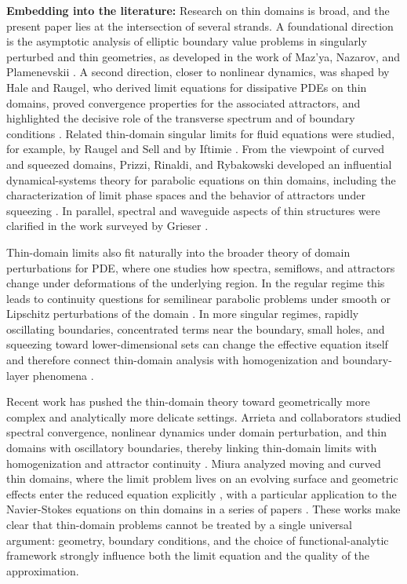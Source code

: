 \documentclass[11pt]{article}
\theoremstyle{definition}
\theoremstyle{remark}
\numberwithin{equation}{section}
\begin{document}
\textbf{Embedding into the literature:} Research on thin domains is broad, and the present paper lies at the intersection of several strands. A foundational direction is the asymptotic analysis of elliptic boundary value problems in singularly perturbed and thin geometries, as developed in the work of Maz'ya, Nazarov, and Plamenevskii \cite{MazyaNazarovPlamenevskii2000,MazyaNazarovPlamenevskii2000b}. A second direction, closer to nonlinear dynamics, was shaped by Hale and Raugel, who derived limit equations for dissipative PDEs on thin domains, proved convergence properties for the associated attractors, and highlighted the decisive role of the transverse spectrum and of boundary conditions \cite{HaleRaugel1992,HaleRaugel1995,Raugel1995}. Related thin-domain singular limits for fluid equations were studied, for example, by Raugel and Sell and by Iftimie \cite{RaugelSell1993,Iftimie2001}. From the viewpoint of curved and squeezed domains, Prizzi, Rinaldi, and Rybakowski developed an influential dynamical-systems theory for parabolic equations on thin domains, including the characterization of limit phase spaces and the behavior of attractors under squeezing \cite{PrizziRybakowski1999,PrizziRybakowski2001,PrizziRybakowski2002}. In parallel, spectral and waveguide aspects of thin structures were clarified in the work surveyed by Grieser \cite{Grieser2008,Grieser2017}.

Thin-domain limits also fit naturally into the broader theory of domain perturbations for PDE, where one studies how spectra, semiflows, and attractors change under deformations of the underlying region. In the regular regime this leads to continuity questions for semilinear parabolic problems under smooth or Lipschitz perturbations of the domain \cite{Arrieta2004,PereiraPereira2007,LeeNguyen2023}. In more singular regimes, rapidly oscillating boundaries, concentrated terms near the boundary, small holes, and squeezing toward lower-dimensional sets can change the effective equation itself and therefore connect thin-domain analysis with homogenization and boundary-layer phenomena \cite{JimenezCasas2020,TavaresLimaLozada2024,AragaoArrietaBruschi2025}.

Recent work has pushed the thin-domain theory toward geometrically more complex and analytically more delicate settings. Arrieta and collaborators studied spectral convergence, nonlinear dynamics under domain perturbation, and thin domains with oscillatory boundaries, thereby linking thin-domain limits with homogenization and attractor continuity \cite{Arrieta2004,Arrieta2024,ArrietaNakasatoVillanueva2025,BarbosaVillanueva2024}. Miura analyzed moving and curved thin domains, where the limit problem lives on an evolving surface and geometric effects enter the reduced equation explicitly \cite{Miura2017,Miura2023}, with a particular application to the Navier-Stokes equations on thin domains in a series of papers \cite{miura2022navier,miura2021navier,miura2020navier}. 
These works make clear that thin-domain problems cannot be treated by a single universal argument: geometry, boundary conditions, and the choice of functional-analytic framework strongly influence both the limit equation and the quality of the approximation.
\end{document}
